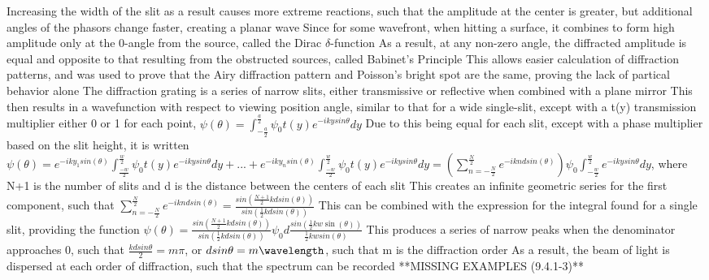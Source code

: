 \documentclass[11 pt, twoside]{article}
\newenvironment{outline*}
{
	\begin{outline}[enumerate]
	}
	{\end{outline}
}
\begin{document}
\begin{outline*}
\2 Increasing the width of the slit as a result causes more extreme reactions, such that the amplitude at the center is greater, but additional angles of the phasors change faster, creating a planar wave
\1 Since for some wavefront, when hitting a surface, it combines to form high amplitude only at the 0-angle from the source, called the Dirac $\delta$-function
\2 As a result, at any non-zero angle, the diffracted amplitude is equal and opposite to that resulting from the obstructed sources, called Babinet's Principle
\2 This allows easier calculation of diffraction patterns, and was used to prove that the Airy diffraction pattern and Poisson's bright spot are the same, proving the lack of partical behavior alone
\1 The diffraction grating is a series of narrow slits, either transmissive or reflective when combined with a plane mirror
\2 This then results in a wavefunction with respect to viewing position angle, similar to that for a wide single-slit, except with a t(y) transmission multiplier either 0 or 1 for each point, $\psi(\theta) = \int^{\frac{a}{2}}_{-\frac{a}{2}} \psi_0t(y)e^{-ikysin\theta}dy$
\3 Due to this being equal for each slit, except with a phase multiplier based on the slit height, it is written $\psi(\theta) = e^{-iky_1sin(\theta)}\int^{\frac{w}{2}}_{\frac{-w}{2}} \psi_0t(y)e^{-ikysin\theta}dy + ... + e^{-iky_nsin(\theta)}\int^{\frac{w}{2}}_{\frac{-w}{2}} \psi_0t(y)e^{-ikysin\theta}dy = (\sum^\frac{N}{2}_{n = -\frac{N}{2}} e^{-ikndsin(\theta)})\psi_0\int^{\frac{w}{2}}_{-\frac{w}{2}} e^{-ikysin\theta}dy$, where N+1 is the number of slits and d is the distance between the centers of each slit
\3 This creates an infinite geometric series for the first component, such that $\sum^\frac{N}{2}_{n = -\frac{N}{2}} e^{-ikndsin(\theta)} = \frac{sin(\frac{N+1}{2}kdsin(\theta))}{sin(\frac{1}{2}kdsin(\theta))}$
\3 This can be combined with the expression for the integral found for a single slit, providing the function $\psi(\theta) = \frac{sin(\frac{N+1}{2}kdsin(\theta))}{sin(\frac{1}{2}kdsin(\theta))}\psi_0d\frac{sin(\frac{1}{2}kw\sin(\theta))}{\frac{1}{2}kwsin(\theta)}$
\2 This produces a series of narrow peaks when the denominator approaches 0, such that $\frac{kdsin\theta}{2} = m\pi$, or $dsin\theta = m\wavelength$, such that m is the diffraction order
\3 As a result, the beam of light is dispersed at each order of diffraction, such that the spectrum can be recorded
\2 **MISSING EXAMPLES (9.4.1-3)**
\end{outline*}
\end{document}
